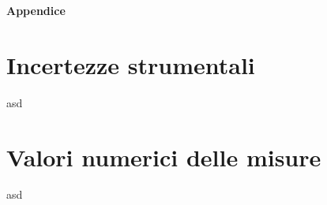 \appendix
  \textbf{\huge{Appendice}}
  \section{Incertezze strumentali}\label{sec:incertezze-strumentali}
    asd

  \section{Valori numerici delle misure}\label{sec:valori-misure}
    asd
